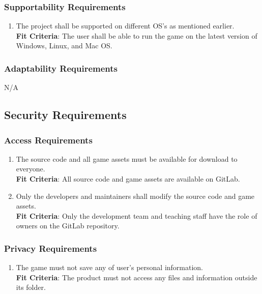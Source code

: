 \documentclass[12pt, titlepage]{article}
\begin{document}
\subsubsection{Supportability Requirements}
\begin{enumerate}[leftmargin=1.45cm, label={MS \arabic*}]
    \item The project shall be supported on different OS's as mentioned earlier.\\
     \textbf{Fit Criteria}: The user shall be able to run the game on the latest version of Windows, Linux, and Mac OS.
\end{enumerate}
\subsubsection{Adaptability Requirements}
N/A
\subsection{Security Requirements}
\subsubsection{Access Requirements}
\begin{enumerate}[leftmargin=1.45cm, label={SR \arabic*}]
    \item The source code and all game assets must be available for download to everyone.\\
    \textbf{Fit Criteria}: All source code and game assets are available on GitLab. 
    
    \item Only the developers and maintainers shall modify the source code and game assets. \\
    \textbf{Fit Criteria}: Only the development team and teaching staff have the role of owners on the GitLab repository.
    
\end{enumerate}

\subsubsection{Privacy Requirements}
\begin{enumerate}[leftmargin=1.45cm, start=1,label={SR \arabic*}]
    \item The game must not save any of user's personal information.\\
    \textbf{Fit Criteria}: The product must not access any files and information outside its folder.
\end{enumerate}
\end{document}
